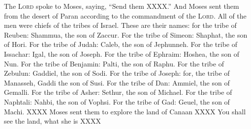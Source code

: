 

\begin{enumerate*}[mode=unboxed]
     The \textsc{Lord} spoke to Moses, saying,%
     ``Send them XXXX.''%
     And Moses sent them from the desert of Paran according to the commandment of the \textsc{Lord}. All of the men were chiefs of the tribes of Israel.%
     These are their names: for the tribe of Reuben: Shammua, the son of Zaccur.%
     For the tribe of Simeon: Shaphat, the son of Hori.%
     For the tribe of Judah: Caleb, the son of Jephunneh.%
     For the tribe of Issachar: Igal, the son of Joseph.%
     For the tribe of Ephraim: Hoshea, the son of Nun.%
     For the tribe of Benjamin: Palti, the son of Raphu.%
     For the tribe of Zebulun: Gaddiel, the son of Sodi.%
     For the tribe of Joseph: for, the tribe of Manasseh, Gaddi the son of Susi.%
     For the tribe of Dan: Ammiel, the son of Gemalli.%
     For the tribe of Asher: Sethur, the son of Michael.%
     For the tribe of Naphtali: Nahbi, the son of Vophsi.%
     For the tribe of Gad: Geuel, the son of Machi.%
     XXXX%
     Moses sent them to explore the land of Canaan XXXX%
     You shall see the land, what she is XXXX%
\end{enumerate*}
